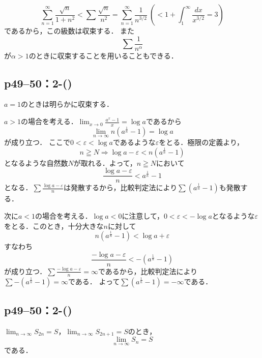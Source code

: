 \documentclass[a4paper,10pt,fleqn]{ltjsarticle}
\begin{document}
\begin{screen}
    \[
        \sum ^{\infty}_{n=1}\frac{\sqrt{n}}{1+n^2}<\sum \frac{\sqrt{n}}{n^2}=\sum^{\infty}_{n=1}\frac{1}{n^{3/2}}~\left(<1+\int^{\infty}_{1}\frac{dx}{x^{3/2}}=3\right)
    \]
    であるから，この級数は収束する．
    また
    \[
        \sum \frac{1}{n^\alpha}
    \]
    が$\alpha >1$のときに収束することを用いることもできる．
\end{screen}


\subsection*{p49--50：2-()}

\begin{screen}
    $a=1$のときは明らかに収束する．

    $a>1$の場合を考える．$\lim_{x \to 0} \frac{a^x-1}{x} = \log a$であるから
    \[
        \lim_{n \to \infty} n(a^{\frac{1}{n}}-1) = \log a
    \]
    が成り立つ．
    ここで$0 < \varepsilon <\log a$であるような$\varepsilon$をとる．極限の定義より，
    \[
        n \geqq N \Longrightarrow \log a - \varepsilon < n (a^\frac{1}{n}-1)
    \]
    となるような自然数$N$が取れる．よって，$n \geqq N$において
    \[
        \frac{\log a - \varepsilon}{n} < a^\frac{1}{n}-1
    \]
    となる．$\sum \frac{\log a - \varepsilon}{n}$は発散するから，比較判定法により$\sum (a^{\frac{1}{n}}-1)$も発散する．

    次に$ a<1$の場合を考える．$\log a <0$に注意して，$0 < \varepsilon <-\log a $となるような$\varepsilon$をとる．このとき，十分大きな$n$に対して
    \[
        n (a^\frac{1}{n}-1) < \log a + \varepsilon
    \]
    すなわち
    \[
        \frac{-\log a - \varepsilon}{n} < -(a^\frac{1}{n}-1)
    \]
    が成り立つ．$\sum \frac{-\log a - \varepsilon}{n}=\infty$であるから，比較判定法により$\sum -(a^{\frac{1}{n}}-1)=\infty$である．
    よって$\sum (a^{\frac{1}{n}}-1)=-\infty$である．
\end{screen}


\subsection*{p49--50：2-()}


$\lim_{n \to \infty} S_{2n}=S$，$\lim_{n \to \infty} S_{2n+1}=S$のとき，
\[
    \lim_{n \to \infty} S_n = S
\]
である．
\end{document}
